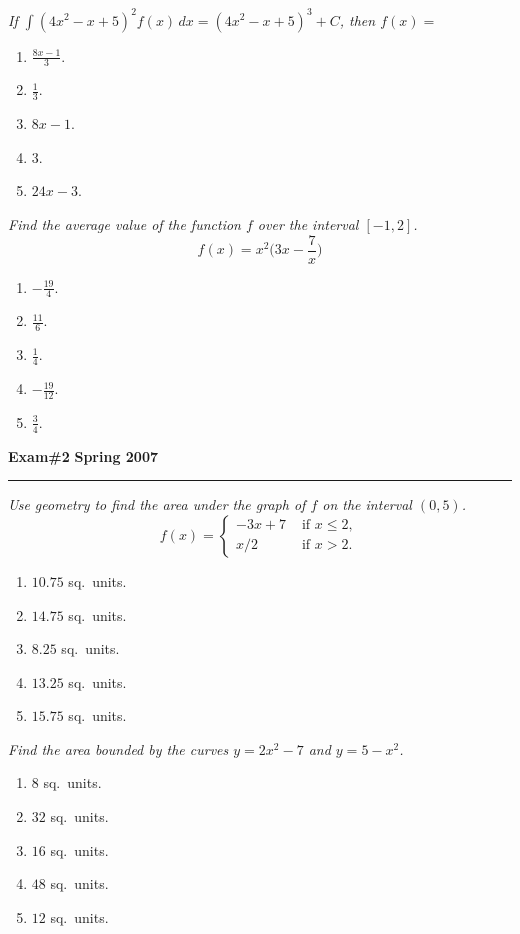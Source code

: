\documentclass[12pt]{article}
\begin{document}
{\problem \em If $\int (4x^2-x+5)^2 f(x)\, dx = (4x^2-x+5)^3 + C$,
  then $f(x) =$}
\begin{enumerate}
\item $\displaystyle{\frac{8x-1}{3}}$.
\item $\displaystyle{\frac{1}{3}}$.
\item $8x-1$.
\item $3$.
\item $24x-3$.
\end{enumerate}
\vspace{5cm}
{\problem \em Find the average value of the function $f$ over the
  interval $[-1,2]$.
\begin{equation*}
  f(x) = x^2 \Big( 3x - \frac{7}{x} \Big)
\end{equation*}}
\begin{enumerate}
\item $\displaystyle{-\frac{19}{4}}$.
\item $\displaystyle{\frac{11}{6}}$.
\item $\displaystyle{\frac{1}{4}}$.
\item $\displaystyle{-\frac{19}{12}}$.
\item $\displaystyle{\frac{3}{4}}$.
\end{enumerate}
\newpage

\hfill{\large\bf Exam\#2}\hfill{\large\bf
  Spring 2007}\hrule
\bigskip

{\problem \em Use geometry to find the area under the graph of $f$ on
  the interval $(0,5)$.
  \begin{equation*}
    f(x) = \left\{ \begin{array}{cl}
        -3x+7 &\text{ if } x\leq 2, \\
        x/2 &\text{ if } x>2.
      \end{array} \right.
  \end{equation*}}
\begin{enumerate}
\item $10.75$ sq.~units.
\item $14.75$ sq.~units.
\item $8.25$ sq.~units.
\item $13.25$ sq.~units.
\item $15.75$ sq.~units.
\end{enumerate}
\vspace{5cm}

{\problem \em Find the area bounded by the curves $y=2x^2-7$ and
  $y=5-x^2$.}
\begin{enumerate}
\item $8$ sq.~units.
\item $32$ sq.~units.
\item $16$ sq.~units.
\item $48$ sq.~units.
\item $12$ sq.~units.
\end{enumerate}
\newpage
\end{document}
